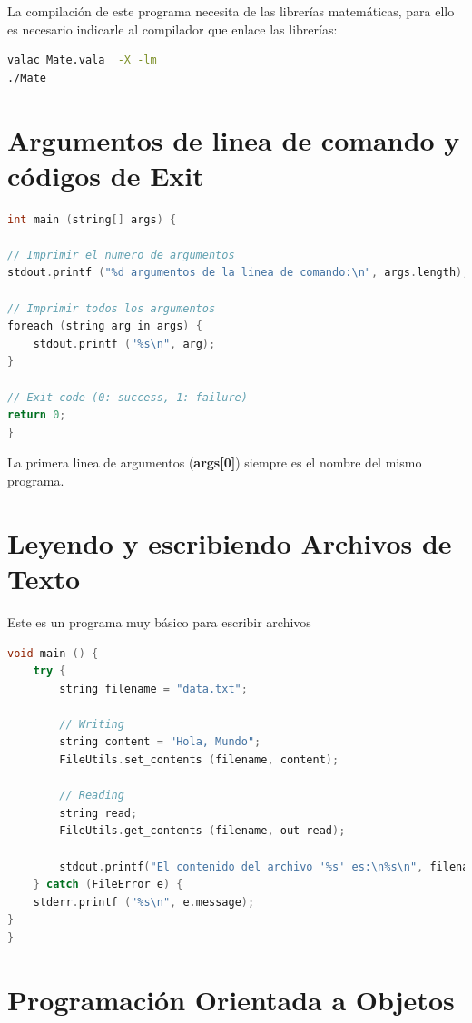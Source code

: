 \documentclass[12pt,twoside]{book}
\begin{document}
La compilación de este programa necesita de las librerías matemáticas, para ello es necesario indicarle al compilador que enlace las librerías:

\begin{lstlisting}[language=bash]
valac Mate.vala  -X -lm
./Mate
\end{lstlisting}

\section{Argumentos de linea de comando y códigos de Exit}

\begin{lstlisting}[language=C++]
int main (string[] args) {

// Imprimir el numero de argumentos
stdout.printf ("%d argumentos de la linea de comando:\n", args.length);

// Imprimir todos los argumentos
foreach (string arg in args) {
	stdout.printf ("%s\n", arg);
}

// Exit code (0: success, 1: failure)
return 0;
}
\end{lstlisting}

La primera linea de argumentos (\textbf{args[0]}) siempre es el nombre del mismo programa.

\section{Leyendo y escribiendo Archivos de Texto}

Este es un programa muy básico para escribir archivos

\begin{lstlisting}[language=C++]
void main () {
	try {
		string filename = "data.txt";
		
		// Writing
		string content = "Hola, Mundo";
		FileUtils.set_contents (filename, content);
		
		// Reading
		string read;
		FileUtils.get_contents (filename, out read);
		
		stdout.printf("El contenido del archivo '%s' es:\n%s\n", filename, read);
	} catch (FileError e) {
	stderr.printf ("%s\n", e.message);
}
}
\end{lstlisting}


\section{Programación Orientada a Objetos}
\end{document}
